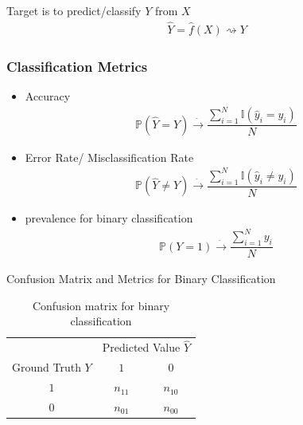     Target is to predict/classify $ Y $ from $ X $
    \begin{align}
        \hat{Y}=\hat{f}(X)\rightsquigarrow Y
    \end{align}
    
\subsubsection{Classification Metrics}

\begin{itemize}[topsep=2pt,itemsep=0pt]
    \item Accuracy
    \begin{align}
        \mathbb{P}\left( \hat{Y}=Y \right) \xrightarrow[]{\hat{ }} \dfrac{\sum_{i=1}^N\mathbb{I}(\hat{y}_i=y_i)}{N}  
    \end{align}
    \item Error Rate/ Misclassification Rate
    \begin{align}
        \mathbb{P}\left( \hat{Y}\neq Y \right) \xrightarrow[]{\hat{ }} \dfrac{\sum_{i=1}^N\mathbb{I}(\hat{y}_i\neq y_i)}{N}  
    \end{align}
    \item prevalence for binary classification
    \begin{align}
        \mathbb{P}\left( Y=1 \right)  \xrightarrow[]{\hat{ }} \dfrac{\sum_{i=1}^N y_i}{N}
    \end{align}
    
\end{itemize}

\begin{point}
    Confusion Matrix and Metrics for Binary Classification
\end{point}

\begin{table}[H]
    \centering
    \renewcommand\arraystretch{1}
    \caption{Confusion matrix for binary classification}
    \begin{tabular}{ccc}
        \hline
        \hline
        &\multicolumn{2}{c}{Predicted Value $ \hat{Y} $}\\
        \cline{2-3}
        Ground Truth $ Y $&$ 1 $&$ 0 $\\
        \hline
        $ 1 $&$ n_{11} $&$ n_{10} $\\
        $ 0  $&$ n_{01} $&$ n_{00} $\\
        \hline
        \hline
    \end{tabular}
    \label{}
\end{table}

